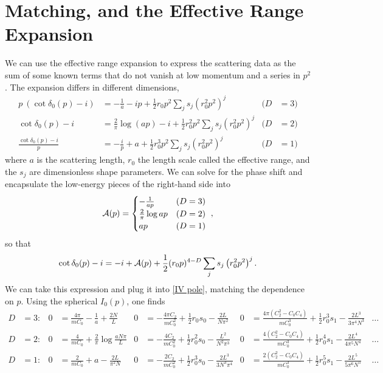 \section{Matching, and the Effective Range Expansion}\label{sec:ere}

We can use the effective range expansion to express the scattering data as the sum of some known terms that do not vanish at low momentum and a series in $p^2$.  The expansion differs in different dimensions,
\begin{align}
    p\ (\cot \delta_0(p) - i)
    &=
    -\frac{1}{a} - ip + \frac{1}{2} r_0 p^2 \sum_j s_j (r_0^2 p^2)^j
    &
    (D&=3)
    \nonumber\\
    \cot \delta_0(p) - i
    &=
    \frac{2}{\pi} \log(a p) -i + \frac{1}{2} r_0^2 p^2 \sum_j s_j (r_0^2 p^2)^j
    &
    (D&=2)
    \\\nonumber
    \frac{\cot\delta_0(p)-i}{p}
    &=
    -\frac{i}{p} + a + \frac{1}{2} r_0^3 p^2 \sum_j s_j( r_0^2 p^2)^j
    &
    (D&=1)
\end{align}
where $a$ is the scattering length, $r_0$ the length scale called the effective range, and the $s_j$ are dimensionless shape parameters.
We can solve for the phase shift and encapsulate the low-energy pieces of the right-hand side into
\begin{equation}
    \mathcal{A}(p) =
    \begin{cases}
        -\frac{1}{ap}           &   (D=3)\\
        \frac{2}{\pi} \log ap   &   (D=2)\\
        ap                      &   (D=1)
    \end{cases}\ ,
\end{equation}
so that
\begin{equation}\label{eq:ERE}
    \cot \delta_0(p) - i = -i + \mathcal{A}(p) + \frac{1}{2} (r_0 p)^{4-D} \sum_j s_j \left(r_0^2p^2\right)^j.
\end{equation}
We can take this expression and plug it into \eqref{IV pole}, matching the dependence on $p$.
Using the spherical $I_0(p)$, one finds
\begin{align}
    \nonumber
    D&=3:
    &
    0&=\frac{4 \pi}{m C_0}-\frac{1}{a} + \frac{2N}{L}
    &
    0&=- \frac{4 \pi C_2}{m C_0^2} + \frac{1}{2}r_0 s_0 - \frac{2 L}{N \pi^2}
    &
    0&=\frac{4\pi(C_2^2-C_0 C_4)}{m C_0^3} + \frac{1}{2} r_0^3 s_1 - \frac{2L^3}{3\pi^4 N^3}
    &\ldots&
    \\
    D&=2:
    &
    0&=\frac{4}{m C_0} + \frac{2}{\pi} \log \frac{a N \pi}{L}
    &
    0&=- \frac{4 C_2}{m C_0^2} + \frac{1}{2}r_0^2 s_0  - \frac{L^2}{N^2 \pi^3}
    &
    0&=\frac{4(C_2^2-C_0 C_4)}{m C_0^3} + \frac{1}{2} r_0^4 s_1 - \frac{2 L^4}{4\pi^5 N^4}
    &\ldots&
    \\
    D&=1:
    &
    0&=\frac{2}{m C_0}+a-\frac{2L}{\pi^2N}
    &
    0&=- \frac{2 C_2}{m C_0^2} + \frac{1}{2}r_0^3 s_0 - \frac{2 L^3}{3N^3 \pi^4}
    &
    0&=\frac{2(C_2^2-C_0 C_4)}{m C_0^3} + \frac{1}{2} r_0^5 s_1 - \frac{2 L^5}{5\pi^6 N^5 }
    &\ldots&
    \nonumber
\end{align}
